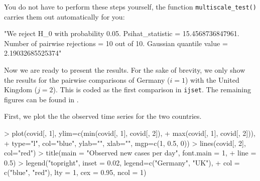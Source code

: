 \documentclass[a4paper]{article}
\begin{document}
You do not have to perform these steps yourself, the function \verb|multiscale_test()| carries them out automatically for you:

\begin{Schunk}
\begin{Soutput}
[1] "We reject H_0 with probability 0.05. Psihat_statistic = 15.4568736847961. Number of pairwise rejections = 10 out of 10. Gaussian quantile value = 2.19032685525374"
\end{Soutput}
\end{Schunk}

Now we are ready to present the results. For the sake of brevity, we only show the results for the pairwise comparisons of Germany ($i = 1$) with the United Kingdom ($j = 2$). This is coded as the first comparison in \verb|ijset|. The remaining figures can be found in \cite{KhismatullinaVogt2023}.

First, we plot the the observed time series for the two countries.

\begin{Schunk}
\begin{Sinput}
> plot(covid[, 1], ylim=c(min(covid[, 1], covid[, 2]),
+                         max(covid[, 1], covid[, 2])),
+      type="l", col="blue", ylab="", xlab="", mgp=c(1, 0.5, 0))
> lines(covid[, 2], col="red")
> title(main = "Observed new cases per day", font.main = 1,
+       line = 0.5)
> legend("topright", inset = 0.02, legend=c("Germany", "UK"),
+        col = c("blue", "red"), lty = 1, cex = 0.95, ncol = 1)
\end{Sinput}
\end{Schunk}
\end{document}
